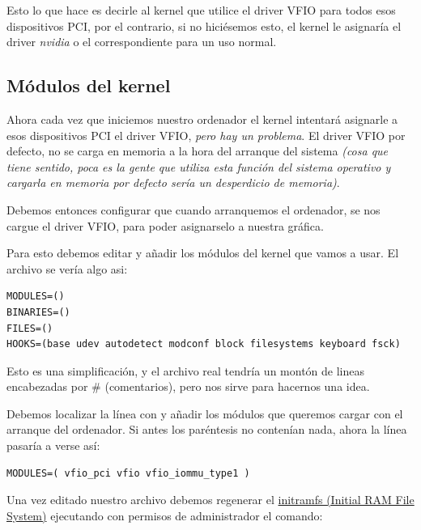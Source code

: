\documentclass[11pt]{article}
\begin{document}
Esto lo que hace es decirle al kernel que utilice el driver VFIO para todos esos dispositivos PCI, por el contrario, si no hiciésemos esto, el kernel le asignaría el driver \textit{nvidia} o el correspondiente para un uso normal.

\subsection{Módulos del kernel}

Ahora cada vez que iniciemos nuestro ordenador el kernel intentará asignarle a esos dispositivos PCI el driver VFIO, \textit{pero hay un problema}. El driver VFIO por defecto, no se carga en memoria a la hora del arranque del sistema \textit{(cosa que tiene sentido, poca es la gente que utiliza esta función del sistema operativo y cargarla en memoria por defecto sería un desperdicio de memoria)}.

\vspace{5pt}

Debemos entonces configurar que cuando arranquemos el ordenador, se nos cargue el driver VFIO, para poder asignarselo a nuestra gráfica.

\vspace{5pt}

Para esto debemos editar  y añadir los módulos del kernel que vamos a usar. El archivo se vería algo asi:

\begin{verbatim}
MODULES=()
BINARIES=()
FILES=()
HOOKS=(base udev autodetect modconf block filesystems keyboard fsck)
\end{verbatim}

Esto es una simplificación, y el archivo real tendría un montón de lineas encabezadas por \# (comentarios), pero nos sirve para hacernos una idea.

\vspace{5pt}

Debemos localizar la línea con  y añadir los módulos que queremos cargar con el arranque del ordenador. Si antes los paréntesis no contenían nada, ahora la línea pasaría a verse así:

\begin{verbatim}
MODULES=( vfio_pci vfio vfio_iommu_type1 )
\end{verbatim}

Una vez editado nuestro archivo debemos regenerar el \href{https://en.wikipedia.org/wiki/Initial\_ramdisk}{initramfs (Initial RAM File System)} ejecutando con permisos de administrador el comando:
\end{document}
